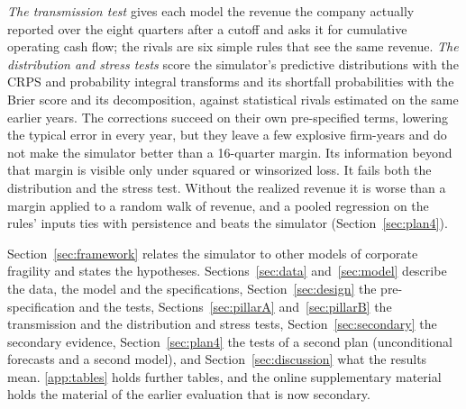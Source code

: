\documentclass[preprint,12pt,authoryear]{elsarticle}
\begin{document}
\emph{The transmission test} gives each model the revenue the company actually reported over the eight quarters after a cutoff and asks it for cumulative operating cash flow; the rivals are six simple rules that see the same revenue. \emph{The distribution and stress tests} score the simulator's predictive distributions with the CRPS and probability integral transforms and its shortfall probabilities with the Brier score and its decomposition, against statistical rivals estimated on the same earlier years. The corrections succeed on their own pre-specified terms, lowering the typical error in every year, but they leave a few explosive firm-years and do not make the simulator better than a 16-quarter margin. Its information beyond that margin is visible only under squared or winsorized loss. It fails both the distribution and the stress test. Without the realized revenue it is worse than a margin applied to a random walk of revenue, and a pooled regression on the rules' inputs ties with persistence and beats the simulator (Section~\ref{sec:plan4}).

Section~\ref{sec:framework} relates the simulator to other models of corporate fragility and states the hypotheses. Sections~\ref{sec:data} and~\ref{sec:model} describe the data, the model and the specifications, Section~\ref{sec:design} the pre-specification and the tests, Sections~\ref{sec:pillarA} and~\ref{sec:pillarB} the transmission and the distribution and stress tests, Section~\ref{sec:secondary} the secondary evidence, Section~\ref{sec:plan4} the tests of a second plan (unconditional forecasts and a second model), and Section~\ref{sec:discussion} what the results mean. \ref{app:tables} holds further tables, and the online supplementary material holds the material of the earlier evaluation that is now secondary.




\end{document}
